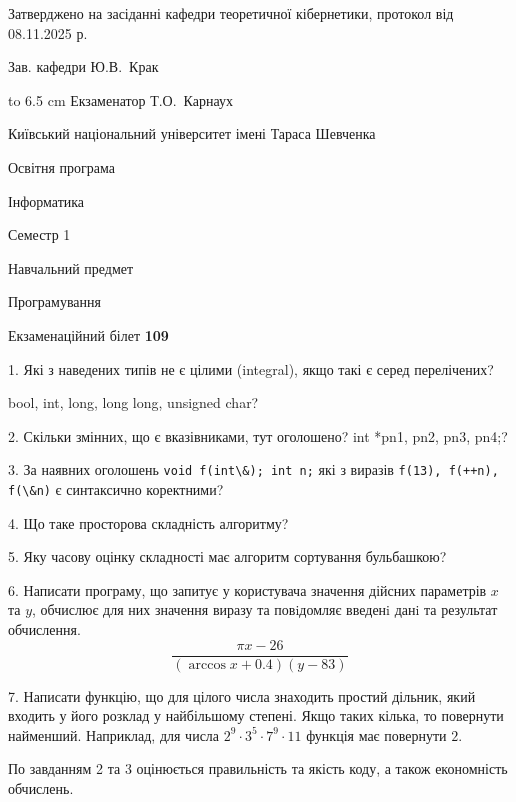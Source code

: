 \documentclass[12pt, ukrainian]{article}
\def\code#1{\Verb!#1!}
\begin{document}
{\smallskip\smallskip \begin {scriptsize} Затверджено на засіданні кафедри теоретичної кібернетики, протокол   від   08.11.2025 р.\par\smallskip\smallskip\smallskip\smallskip
{\parbox {6.5 cm} {Зав. кафедри \dotfill Ю.В.~Крак}}\hspace {0.7cm} {\hbox to 6.5 cm { Екзаменатор \dotfill Т.О.~Карнаух}} \end{scriptsize}}
\newpage
{{\begin {scriptsize}\par
{ \center  Київський національний університет імені Тараса Шевченка \par}
{\parbox {5 cm}{Освітня програма \hfill}{\parbox {7 cm}{Інформатика\hfill}}\parbox {6 cm}{\hfill Семестр 1}}\par
{\parbox {5 cm} {Навчальний предмет \hfill}\parbox {7 cm}{Програмування \hfill}\parbox {6cm}{\hfill}\par}\vspace{-15pt} \end{scriptsize}}{\center Екзаменаційний білет \No \textbf { 109 }\par}}
{%
1. Які з наведених типів не є цілими (integral), якщо такі є серед перелічених?

bool, int, long, long long, unsigned char?
\par
\vspace{2mm}
2. Скільки змінних, що є вказівниками, тут оголошено?
int *pn1, pn2, pn3, pn4;?
\par
\vspace{2mm}
3. За наявних оголошень \code{void f(int\&); int n;} які з виразів \code{f(13), f(++n), f(\&n)} є синтаксично коректними?
\par
\vspace{2mm}
4. Що таке просторова складність алгоритму?
\par
\vspace{2mm}
5. Яку часову оцінку складності має алгоритм сортування бульбашкою?
\par
\vspace{2mm}
6. Написати програму, що запитує у користувача значення дійсних параметрів $x$ та $y$, обчислює для них значення виразу та повiдомляє введенi данi та результат обчислення.
$$\frac{\pi x - 26}{(\arccos x + 0.4) (y - 83)}$$ 

\par
7. Написати функцію, що для цілого числа знаходить простий дільник, який входить у його розклад у найбільшому степені. Якщо таких кілька, то повернути найменший. Наприклад, для числа $2^{9}{\cdot}3^5{\cdot}7^9{\cdot}11$ функція має повернути $2$.

По завданням 2 та 3 оцінюється правильність та якість коду, а також економність обчислень.

}
\end{document}

